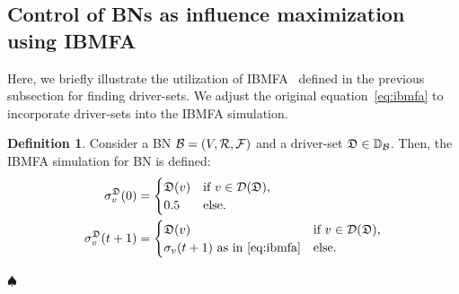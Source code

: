\documentclass[
	digital, oneside, nosansbold, nocolorbold, nolot, nolof
]{fithesis4}
\theoremstyle{definition}
\newtheorem{definition}{Definition}
\theoremstyle{definition}
\newenvironment{ldefinition}
    {\begin{definition}}
	{\par\hspace{\stretch{1}}$\spadesuit$\hspace{\stretch{1}}
     \par\end{definition}}
\begin{document}
\subsection{Control of BNs as influence maximization using IBMFA}

Here, we briefly illustrate the utilization of IBMFA~\cite{infl_max_BN} defined
in the previous subsection for finding driver-sets. We adjust the original
equation~\ref{eq:ibmfa} to incorporate driver-sets into the IBMFA simulation.
\begin{ldefinition}
Consider a BN $\mathcal{B} = (V, \mathcal{R}, \mathcal{F})$ and a driver-set
$\mathfrak{D} \in \mathbb{D}_{\mathcal{B}}$. Then, the IBMFA simulation for BN is defined:
\begin{align*}
    \sigma_v^{\mathfrak{D}}(0) &=
    \begin{cases}
        \mathfrak{D}(v) & \text{if } v \in \mathcal{D}(\mathfrak{D}),\\
        0.5 & \text{else}.
    \end{cases} \\
    \sigma_v^{\mathfrak{D}}(t + 1) &=
    \begin{cases}
        \mathfrak{D}(v) & \text{if } v \in \mathcal{D}(\mathfrak{D}),\\
        \sigma_v(t + 1) \text{ as in~\ref{eq:ibmfa}} & \text{else}.
    \end{cases}
\end{align*}
\end{ldefinition}
\end{document}
